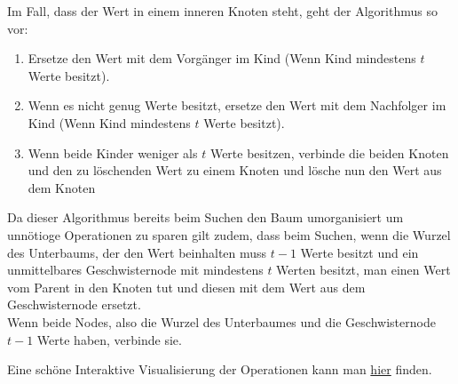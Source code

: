 \documentclass[
../AuD-Zusammenfassung.tex,
]
{subfiles}
\begin{document}
\begin{minipage}[t]{\textwidth}
    \centering
\end{minipage}

Im Fall, dass der Wert in einem inneren Knoten steht, geht der Algorithmus so vor:
\begin{enumerate}
    \item Ersetze den Wert mit dem Vorgänger im Kind (Wenn Kind mindestens $t$ Werte besitzt).
    \item Wenn es nicht genug Werte besitzt, ersetze den Wert mit dem Nachfolger im Kind (Wenn Kind mindestens $t$ Werte besitzt).
    \item Wenn beide Kinder weniger als $t$ Werte besitzen, verbinde die beiden Knoten und den zu löschenden Wert zu einem Knoten und lösche nun den Wert aus dem Knoten
\end{enumerate}
Da dieser Algorithmus bereits beim Suchen den Baum umorganisiert um unnötioge Operationen zu sparen gilt zudem, dass beim Suchen, wenn die Wurzel des Unterbaums, der den Wert beinhalten muss $t - 1$ Werte besitzt und ein unmittelbares Geschwisternode mit mindestens $t$ Werten besitzt, man einen Wert vom Parent in den Knoten tut und diesen mit dem Wert aus dem Geschwisternode ersetzt.\\
Wenn beide Nodes, also die Wurzel des Unterbaumes und die Geschwisternode $t - 1$ Werte haben, verbinde sie.

Eine schöne Interaktive Visualisierung der Operationen kann man \href{https://www.cs.usfca.edu/~galles/visualization/BTree.html}{hier} finden.


\end{document}
